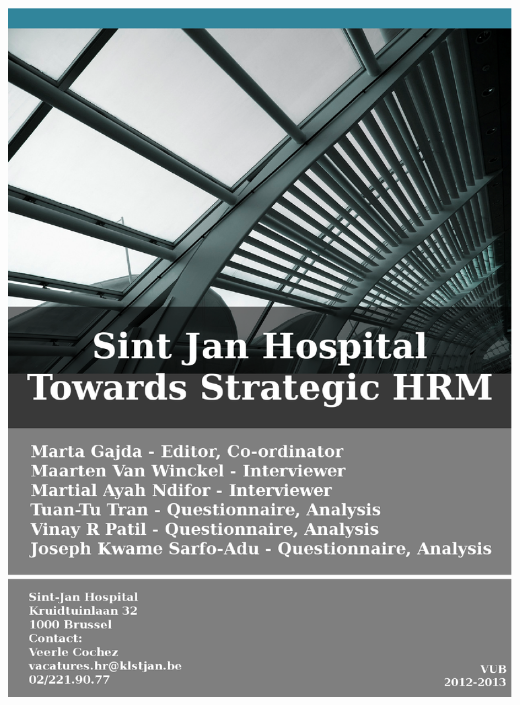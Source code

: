 \documentclass[a4paper,fleqn,11pt,dvips,titlepage]{article}
\numberwithin{figure}{section}
\numberwithin{equation}{section}
\begin{document}

\begin{titlepage}
  \includegraphics[width=20cm, height=28cm]{cover.eps}
\end{titlepage}
\restoregeometry
\end{document}
